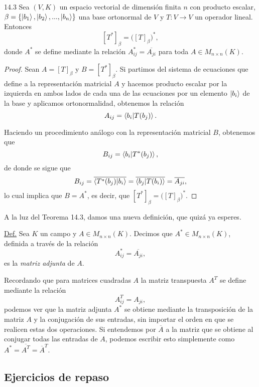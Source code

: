 \documentclass[12pt,libertine]{book}
\begin{document}
\begin{Teo} {14.3}
Sea $(V,K)$ un espacio vectorial de dimensión finita $n$ con producto escalar, $\beta=\{\ket{b_1},\ket{b_2},...,\ket{b_n}\}$ una base ortonormal de $V$ y $T:V\to V$ un operador lineal. Entonces $$[T^*]_\beta=\big([T]_\beta\big)^*,$$ donde $A^*$ se define mediante la relación $A^*_{ij}=\overline{A_{ji}}$ para toda $A\in M_{n\times n}(K)$.
\begin{proof}
Sean $A=[T]_\beta$ y $B=[T^*]_\beta$. Si partimos del sistema de ecuaciones que define a la representación matricial $A$ y hacemos producto escalar por la izquierda en ambos lados de cada una de las ecuaciones por un elemento $\ket{b_i}$ de la base y aplicamos ortonormalidad, obtenemos la relación $$A_{ij}=\braket{b_i|T(b_j)}.$$ 

Haciendo un procedimiento análogo con la representación matricial $B$, obtenemos que $$B_{ij}=\braket{b_i|T^*(b_j)},$$ de donde se sigue que $$B_{ij}=\overline{\braket{T^*(b_j)|b_i}}=\overline{\braket{b_j|T(b_i)}}=\overline{A_{ji}},$$ lo cual implica que $B=A^*$, es decir, que $[T^*]_\beta=\big([T]_\beta\big)^*$.
\end{proof}
\end{Teo}

A la luz del Teorema 14.3, damos una nueva definición, que quizá ya esperes.

\vspace{5mm}
\begin{tcolorbox}
\underline{Def.} Sea $K$ un campo y $A\in M_{n\times n}(K)$. Decimos que $A^*\in M_{n\times n}(K)$, definida a través de la relación $$A^*_{ij}=\overline{A_{ji}},$$ es la \emph{matriz adjunta} de $A$.
\end{tcolorbox}
\vspace{5mm}

\noindent Recordando que para matrices cuadradas $A$ la matriz transpuesta $A^T$ se define mediante la relación $$A^T_{ij}=A_{ji},$$ podemos ver que la matriz adjunta $A^*$ se obtiene mediante la transposición de la matriz $A$ y la conjugación de sus entradas, sin importar el orden en que se realicen estas dos operaciones. Si entendemos por $\overline{A}$ a la matriz que se obtiene al conjugar todas las entradas de $A$, podemos escribir esto simplemente como $A^*=\overline{A^T}=\overline{A}^T$.

\subsection*{Ejercicios de repaso}
\end{document}
